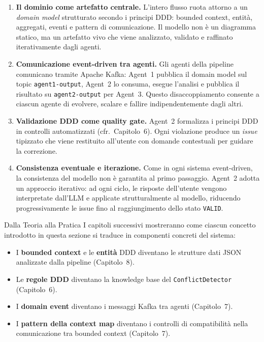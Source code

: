\documentclass[12pt,a4paper]{report}
\begin{document}
\begin{enumerate}
  \item \textbf{Il dominio come artefatto centrale.} L'intero flusso ruota attorno
        a un \textit{domain model} strutturato secondo i principi DDD: bounded
        context, entità, aggregati, eventi e pattern di comunicazione. Il modello
        non è un diagramma statico, ma un artefatto vivo che viene analizzato,
        validato e raffinato iterativamente dagli agenti.

  \item \textbf{Comunicazione event-driven tra agenti.} Gli agenti della pipeline
        comunicano tramite Apache Kafka: Agent~1 pubblica il domain model sul topic
        \texttt{agent1-output}, Agent~2 lo consuma, esegue l'analisi e pubblica il
        risultato su \texttt{agent2-output} per Agent~3. Questo disaccoppiamento
        consente a ciascun agente di evolvere, scalare e fallire indipendentemente
        dagli altri.

  \item \textbf{Validazione DDD come quality gate.} Agent~2 formalizza i principi
        DDD in controlli automatizzati (cfr.\ Capitolo~6). Ogni violazione produce
        un \textit{issue} tipizzato che viene restituito all'utente con domande
        contestuali per guidare la correzione.

  \item \textbf{Consistenza eventuale e iterazione.} Come in ogni sistema
        event-driven, la consistenza del modello non è garantita al primo
        passaggio. Agent~2 adotta un approccio iterativo: ad ogni ciclo, le
        risposte dell'utente vengono interpretate dall'LLM e applicate
        strutturalmente al modello, riducendo progressivamente le issue fino al
        raggiungimento dello stato \texttt{VALID}.
\end{enumerate}

\begin{technicalbox}{Dalla Teoria alla Pratica}
I capitoli successivi mostreranno come ciascun concetto introdotto in questa sezione
si traduce in componenti concreti del sistema:
\begin{itemize}
  \item I \textbf{bounded context} e le \textbf{entità} DDD diventano le strutture
        dati JSON analizzate dalla pipeline (Capitolo~8).
  \item Le \textbf{regole DDD} diventano la knowledge base del
        \texttt{ConflictDetector} (Capitolo~6).
  \item I \textbf{domain event} diventano i messaggi Kafka tra agenti (Capitolo~7).
  \item I \textbf{pattern della context map} diventano i controlli di compatibilità
        nella comunicazione tra bounded context (Capitolo~7).
\end{itemize}
\end{technicalbox}
\end{document}
